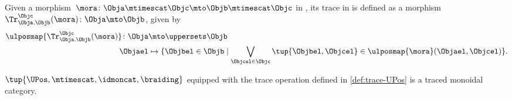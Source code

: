 \begin{definition}
    \label{def:trace-UPos}
    Given a morphism~$\mora\colon \Obja \mtimescat \Objc \mto \Objb\mtimescat \Objc$ in \UPos, its trace in is defined as a morphism~$\Tr_{\Obja,\Objb}^{\Objc}(\mora)\colon \Obja \mto \Objb$, given by
    \begin{equation}
        \begin{aligned}
            \ulposmap{\Tr_{\Obja,\Objb}^{\Objc}(\mora)}\colon \Obja &\mto \uppersets \Objb\\
            \Objael & \mapsto \{\Objbel \in \Objb \mid \bigvee_{\Objcel \in \Objc}\tup{\Objbel, \Objcel}\in \ulposmap{\mora}(\Objael,\Objcel)\}.
        \end{aligned}
    \end{equation}
\end{definition}
\begin{lemma}\label{lem:UPos-is-traced}
  $\tup{\UPos,\mtimescat, \idmoncat,\braiding}$ equipped with the trace operation defined in \cref{def:trace-UPos} is a traced monoidal category.
\end{lemma}
